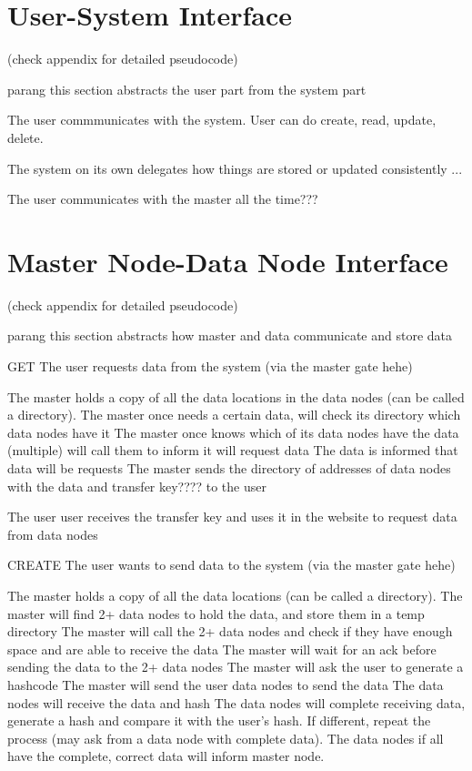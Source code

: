 \documentclass[acmsmall]{acmart}
\begin{document}
\section{User-System Interface}
(check appendix for detailed pseudocode)

parang this section abstracts the user part from the system part

The user commmunicates with the system. User can do create, read, update, delete.

The system on its own delegates how things are stored or updated consistently ...

The user communicates with the master all the time???


\section{Master Node-Data Node Interface}
(check appendix for detailed pseudocode)

parang this section abstracts how master and data communicate and store data

GET
The user requests data from the system (via the master gate hehe)

The master holds a copy of all the data locations in the data nodes (can be called a directory). 
The master once needs a certain data, will check its directory which data nodes have it
The master once knows which of its data nodes have the data (multiple) will call them to inform it will request data
The data is informed that data will be requests
The master sends the directory of addresses of data nodes with the data and transfer key???? to the user

The user user receives the transfer key and uses it in the website to request data from data nodes

CREATE
The user wants to send data to the system (via the master gate hehe)

The master holds a copy of all the data locations (can be called a directory). 
The master will find 2+ data nodes to hold the data, and store them in a temp directory
The master will call the 2+ data nodes and check if they have enough space and are able to receive the data
The master will wait for an ack before sending the data to the 2+ data nodes
The master will ask the user to generate a hashcode
The master will send the user data nodes to send the data
The data nodes will receive the data and hash
The data nodes will complete receiving data, generate a hash and compare it with the user's hash. If different, repeat the process (may ask from a data node with complete data).
The data nodes if all have the complete, correct data will inform master node.
\end{document}
